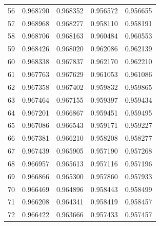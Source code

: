 \begin{table}
\begin{tabular}{rrrrr}
56 & 0.968790 & 0.968352 & 0.956572 & 0.956655 \\
57 & 0.968968 & 0.968277 & 0.958110 & 0.958191 \\
58 & 0.968706 & 0.968163 & 0.960484 & 0.960553 \\
59 & 0.968426 & 0.968020 & 0.962086 & 0.962139 \\
60 & 0.968338 & 0.967837 & 0.962170 & 0.962210 \\
61 & 0.967763 & 0.967629 & 0.961053 & 0.961086 \\
62 & 0.967358 & 0.967402 & 0.959832 & 0.959865 \\
63 & 0.967464 & 0.967155 & 0.959397 & 0.959434 \\
64 & 0.967201 & 0.966867 & 0.959451 & 0.959495 \\
65 & 0.967086 & 0.966543 & 0.959171 & 0.959227 \\
66 & 0.967381 & 0.966210 & 0.958208 & 0.958277 \\
67 & 0.967439 & 0.965905 & 0.957190 & 0.957268 \\
68 & 0.966957 & 0.965613 & 0.957116 & 0.957196 \\
69 & 0.966866 & 0.965300 & 0.957860 & 0.957933 \\
70 & 0.966469 & 0.964896 & 0.958443 & 0.958499 \\
71 & 0.966208 & 0.964341 & 0.958419 & 0.958457 \\
72 & 0.966422 & 0.963666 & 0.957433 & 0.957457 \\
\bottomrule
\end{tabular}
\end{table}
